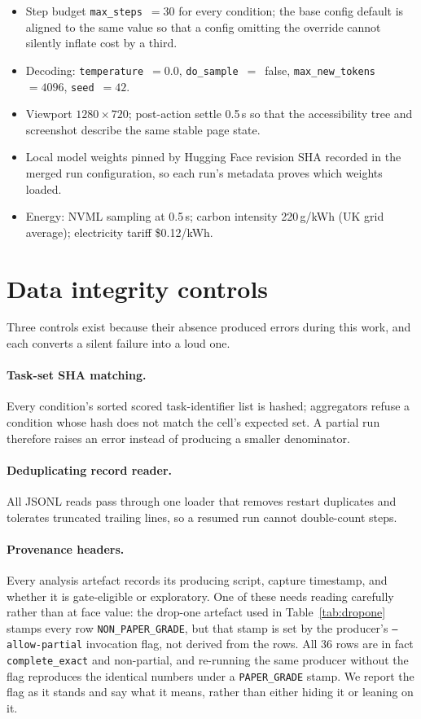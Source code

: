 \begin{itemize}
\item Step budget \texttt{max\_steps}~$=30$ for every condition; the base config
  default is aligned to the same value so that a config omitting the override
  cannot silently inflate cost by a third.
\item Decoding: \texttt{temperature}~$=0.0$, \texttt{do\_sample}~$=$~false,
  \texttt{max\_new\_tokens}~$=4096$, \texttt{seed}~$=42$.
\item Viewport $1280\times720$; post-action settle 0.5\,s so that the
  accessibility tree and screenshot describe the same stable page state.
\item Local model weights pinned by Hugging Face revision SHA recorded in the
  merged run configuration, so each run's metadata proves which weights loaded.
\item Energy: NVML sampling at 0.5\,s; carbon intensity 220\,g/kWh (UK grid
  average); electricity tariff \$0.12/kWh.
\end{itemize}

\FloatBarrier
\section{Data integrity controls}

Three controls exist because their absence produced errors during this work, and
each converts a silent failure into a loud one.

\paragraph{Task-set SHA matching.} Every condition's sorted scored task-identifier
list is hashed; aggregators refuse a condition whose hash does not match the
cell's expected set. A partial run therefore raises an error instead of producing a smaller denominator.

\paragraph{Deduplicating record reader.} All JSONL reads pass through one loader
that removes restart duplicates and tolerates truncated trailing lines, so a
resumed run cannot double-count steps.

\paragraph{Provenance headers.} Every analysis artefact records its producing
script, capture timestamp, and whether it is gate-eligible or exploratory. One
of these needs reading carefully rather than at face value: the drop-one artefact
used in Table~\ref{tab:dropone} stamps every row \texttt{NON\_PAPER\_GRADE},
but that stamp is set by the producer's \texttt{--allow-partial} invocation flag,
not derived from the rows. All 36 rows are in fact \texttt{complete\_exact} and
non-partial, and re-running the same producer without the flag reproduces the
identical numbers under a \texttt{PAPER\_GRADE} stamp. We report the flag as it
stands and say what it means, rather than either hiding it or leaning on it.

